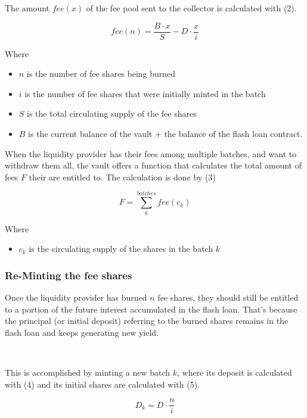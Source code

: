 \documentclass[twocolumn]{article}
\begin{document}
The amount \( fee(x) \) of the fee pool sent to the collector is calculated with (2).

\begin{equation}
fee(n) = \frac{B \cdot x }{S} - D \cdot \frac{x}{i}
\end{equation}

Where
\begin{itemize}
\item \( n \) is the number of fee shares being burned
\item \( i \) is the number of fee shares that were initially minted in the batch
\item \( S \) is the total circulating supply of the fee shares
\item \( B \) is the current balance of the vault \( + \) the balance of the flash loan contract.
\end{itemize}

When the liquidity provider has their fees among multiple batches, and want to withdraw them all, the vault offers a function that calculates the total amount of fees \( F \) their are entitled to. The calculation is done by (3)

\begin{equation}
F = \sum_{k}^{batches} fee (c_k)
\end{equation}

Where
\begin{itemize}
\item \( c_k \) is the circulating supply of the shares in the batch \( k \)
\end{itemize}

\subsubsection{Re-Minting the fee shares}
Once the liquidity provider has burned \( n \) fee shares, they should still be entitled to a portion of the future interest accumulated in the flash loan. That's because the principal (or initial deposit) referring to the burned shares remains in the flash loan and keeps generating new yield. 

\

This is accomplished by minting a new batch \(k\), where its deposit is calculated with (4) and its initial shares are calculated with (5).

\begin{equation}
D_{k} = D \cdot \frac{n}{i}
\end{equation}
\end{document}
